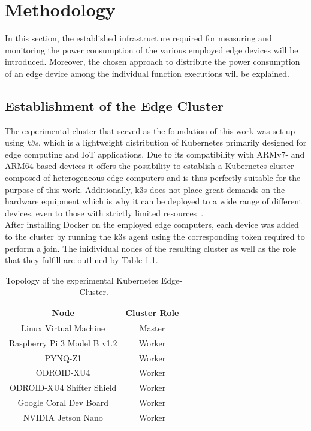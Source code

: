 \chapter{Methodology}\label{chapter:methodology}
In this section, the established infrastructure required for measuring and monitoring the power consumption of the various employed edge devices will be introduced. Moreover, the chosen approach to distribute the power consumption of an edge device among the individual function executions will be explained.

\section{Establishment of the Edge Cluster}
The experimental cluster that served as the foundation of this work was set up using \textit{k3s}, which is a lightweight distribution of Kubernetes primarily designed for edge computing and IoT applications. Due to its compatibility with ARMv7- and ARM64-based devices it offers the possibility to establish a Kubernetes cluster composed of heterogeneous edge computers and is thus perfectly suitable for the purpose of this work. Additionally, k3s does not place great demands on the hardware equipment which is why it can be deployed to a wide range of different devices, even to those with strictly limited resources~\parencite{k3s}.\\
After installing Docker on the employed edge computers, each device was added to the cluster by running the k3s agent using the corresponding token required to perform a join. The inidividual nodes of the resulting cluster as well as the role that they fulfill are outlined by Table \ref{table:1}.

\begin{center}
\begin{table}[h!]
\centering
\begin{tabular}{||c c||} 
 \hline
 Node & Cluster Role \\ [0.5ex] 
 \hline\hline
 Linux Virtual Machine & Master \\ 
 \hline
 Raspberry Pi 3 Model B v1.2 & Worker \\ 
 \hline
 PYNQ-Z1 & Worker \\
 \hline
 ODROID-XU4 & Worker \\
 \hline
 ODROID-XU4 Shifter Shield & Worker \\
 \hline
 Google Coral Dev Board & Worker \\
 \hline
 NVIDIA Jetson Nano & Worker \\ [1ex] 
 \hline
\end{tabular}
\caption{Topology of the experimental Kubernetes Edge-Cluster.}
\label{table:1}
\end{table}
\end{center}

